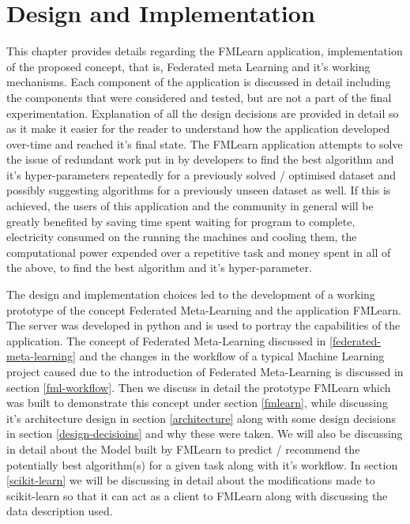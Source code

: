 \chapter{Design and Implementation}

This chapter provides details regarding the FMLearn application, implementation of the proposed concept, that is, Federated meta Learning and it's working mechanisms. Each component of the application is discussed in detail including the components that were considered and tested, but are not a part of the final experimentation. Explanation of all the design decisions are provided in detail so as it make it easier for the reader to understand how the application developed over-time and reached it's final state. The FMLearn application attempts to solve the issue of redundant work put in by developers to find the best algorithm and it's hyper-parameters repeatedly for a previously solved / optimised dataset and possibly suggesting algorithms for a previously unseen dataset as well. If this is achieved, the users of this application and the community in general will be greatly benefited by saving time spent waiting for program to complete, electricity consumed on the running the machines and cooling them, the computational power expended over a repetitive task and money spent in all of the above, to find the best algorithm and it's hyper-parameter.

The design and implementation choices led to the development of a working prototype of the concept Federated Meta-Learning and the application FMLearn. The server was developed in python and is used to portray the capabilities of the application. The concept of Federated Meta-Learning discussed in \ref{federated-meta-learning} and the changes in the workflow of a typical Machine Learning project caused due to the introduction of Federated Meta-Learning is discussed in section \ref{fml-workflow}. Then we discuss in detail the prototype FMLearn which was built to demonstrate this concept under section \ref{fmlearn}, while discussing it's architecture design in section \ref{architecture} along with some design decisions in section \ref{design-decisioins} and why these were taken. We will also be discussing in detail about the Model built by FMLearn to predict / recommend the potentially best algorithm(s) for a given task along with it's workflow. In section \ref{scikit-learn} we will be discussing in detail about the modifications made to scikit-learn so that it can act as a client to FMLearn along with discussing the data description used.

